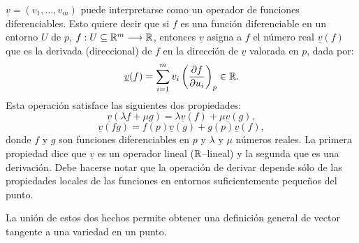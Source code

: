 \documentclass[cursovd_portada.tex]{subfiles}
\begin{document}
$\underline{v}=(v_1,\dots ,v_m)$ puede interpretarse como un operador de funciones diferenciables. Esto quiere
decir que si $f$ es una función diferenciable en un entorno $U$ de $p$, $f:U\subseteq\mathbb{R}^m\longrightarrow\mathbb{R}$, entonces
$\underline{v}$ asigna a $f$ el número real $\underline{v}(f)$ que es la derivada (direccional) de $f$ en la
dirección de $\underline{v}$ valorada en $p$, dada por:
$$\underline{v}(f)=\sum_{i=1}^mv_i\left(\displaystyle{\frac{\partial f}{\partial u_i}}\right)_p\in\mathbb{R}.$$
\hs Esta operación satisface las siguientes dos propiedades:
$$\underline{v}(\lambda f+\mu g)=\lambda\underline{v}(f)+\mu\underline{v}(g),$$
$$\underline{v}(fg)=f(p)\underline{v}(g)+g(p)\underline{v}(f),$$
donde $f$ y $g$ son funciones diferenciables en $p$ y $\lambda$ y $\mu$ números reales. La primera propiedad dice
que $\underline{v}$ es un operador lineal ($\mathbb{R}$--lineal) y la segunda que es una derivación. Debe hacerse notar
que la operación de derivar depende sólo de las propiedades locales de las funciones en entornos suficientemente
peque\~{n}os del punto.
\par
La unión de estos dos hechos permite obtener una definición general de vector tangente a una variedad en un punto.
\end{document}
